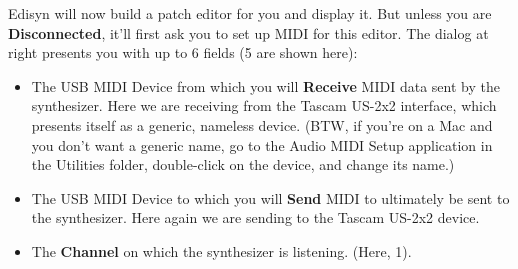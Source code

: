 \documentclass{article}
\begin{document}
Edisyn will now build a patch editor for you and display it.  But unless you are {\bf Disconnected}, it'll first ask you to set up MIDI for this editor.  The dialog at right presents you with up to 6 fields (5 are shown here):

\begin{itemize}
\item The USB MIDI Device from which you will {\bf Receive} MIDI data sent by the synthesizer.  Here we are receiving from the Tascam US-2x2 interface, which presents itself as a generic, nameless device. (BTW, if you're on a Mac and you don't want a generic name, go to the Audio MIDI Setup application in the Utilities folder, double-click on the device, and change its name.)
\item The USB MIDI Device to which you will {\bf Send} MIDI to ultimately be sent to the synthesizer.  Here again we are sending to the Tascam US-2x2 device.
\item The {\bf Channel} on which the synthesizer is listening.  (Here, 1).
\end{itemize}
\end{document}
